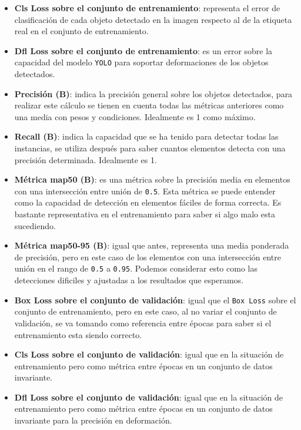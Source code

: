 \begin{itemize}
    \item \textbf{Cls Loss sobre el conjunto de entrenamiento}: representa el error de clasificación de cada objeto detectado en la imagen respecto al de la etiqueta real en el conjunto de entrenamiento.
    \item \textbf{Dfl Loss sobre el conjunto de entrenamiento}: es un error sobre la capacidad del modelo \texttt{YOLO} para soportar deformaciones de los objetos detectados.
    \item \textbf{Precisión (B)}: indica la precisión general sobre los objetos detectados, para realizar este cálculo se tienen en cuenta todas las métricas anteriores como una media con pesos y condiciones. Idealmente es 1 como máximo.
    \item \textbf{Recall (B)}: indica la capacidad que se ha tenido para detectar todas las instancias, se utiliza después para saber cuantos elementos detecta con una precisión determinada. Idealmente es 1.
    \item \textbf{Métrica \acrshort{map}50 (B)}: es una métrica sobre la precisión media en elementos con una intersección entre unión de \texttt{0.5}. Esta métrica se puede entender como la capacidad de detección 
    en elementos fáciles de forma correcta. Es bastante representativa en el entrenamiento para saber si algo malo esta sucediendo.
    \item \textbf{Métrica \acrshort{map}50-95 (B)}: igual que antes, representa una media ponderada de precisión, pero en este caso de los elementos con una intersección entre unión en el rango de \texttt{0.5} a 
    \texttt{0.95}. Podemos considerar esto como las detecciones dificiles y ajustadas a los resultados que esperamos.
    \item \textbf{Box Loss sobre el conjunto de validación}: igual que el \texttt{Box Loss} sobre el conjunto de entrenamiento, pero en este caso, al no variar el conjunto de validación, se va tomando como referencia 
    entre épocas para saber si el entrenamiento esta siendo correcto.
    \item \textbf{Cls Loss sobre el conjunto de validación}: igual que en la situación de entrenamiento pero como métrica entre épocas en un conjunto de datos invariante.
    \item \textbf{Dfl Loss sobre el conjunto de validación}: igual que en la situación de entrenamiento pero como métrica entre épocas en un conjunto de datos invariante para la precisión en deformación.
\end{itemize}

